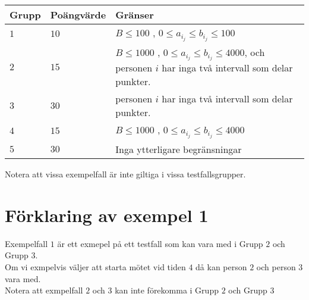 \noindent
\begin{tabular}{| l | l | l |}
  \hline
  Grupp & Poängvärde & Gränser \\ \hline
  $1$   & $10$        & $B \leq 100$ , $0 \leq a_i_j \leq b_i_j  \leq 100$ \\ \hline
  $2$   & $15$       & $B \leq  1000$ , $0 \leq a_i_j \leq b_i_j  \leq 4000$, och personen $i$ har inga två intervall som delar punkter. \\ \hline
  $3$   & $30$       & personen $i$ har inga två intervall som delar punkter. \\ \hline
  $4$   & $15$       & $B \leq 1000$ , $0 \leq a_i_j \leq b_i_j  \leq 4000$ \\ \hline
  $5$   & $30$       & Inga ytterligare begränsningar \\ \hline
\end{tabular}
Notera att vissa exempelfall är inte giltiga i vissa testfallsgrupper.

\section*{Förklaring av exempel 1}
Exempelfall $1$ är ett exmepel på ett testfall som kan vara med i Grupp $2$ och Grupp $3$.\\ Om vi exmpelvis väljer att starta mötet vid tiden $4$ då kan person $2$ och person $3$ vara med.\\ Notera att exmpelfall $2$ och $3$ kan inte förekomma i Grupp $2$ och Grupp $3$
